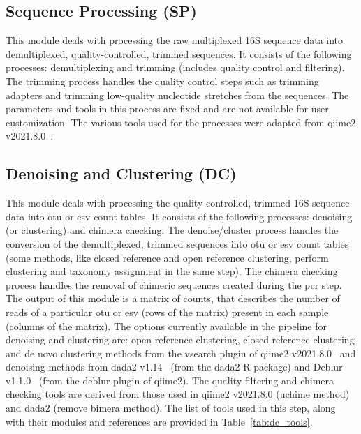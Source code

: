   \subsection*{Sequence Processing (SP)}
  This module deals with processing the raw multiplexed 16S sequence data into demultiplexed, quality-controlled, trimmed sequences.
  It consists of the following processes: demultiplexing and trimming (includes quality control and filtering).
  The trimming process handles the quality control steps such as trimming adapters and trimming low-quality nucleotide stretches from the sequences.
  The parameters and tools in this process are fixed and are not available for user customization.
  The various tools used for the processes were adapted from \ac{qiime2} v2021.8.0~\cite{bolyenReproducibleInteractiveScalable2019}.

  \subsection*{Denoising and Clustering (DC)}
  \vspace{-5mm}
  This module deals with processing the quality-controlled, trimmed 16S sequence data into \ac{otu} or \ac{esv} count tables.
  It consists of the following processes: denoising (or clustering) and chimera checking.
  The denoise/cluster process handles the conversion of the demultiplexed, trimmed sequences into \ac{otu} or \ac{esv} count tables (some methods, like closed reference and open reference clustering, perform clustering and taxonomy assignment in the same step).
  The chimera checking process handles the removal of chimeric sequences created during the \ac{pcr} step.
  The output of this module is a matrix of counts, that describes the number of reads of a particular \ac{otu} or \ac{esv} (rows of the matrix) present in each sample (columns of the matrix).
  The options currently available in the pipeline for denoising and clustering are: open reference clustering, closed reference clustering and de novo clustering methods from the vsearch plugin of \ac{qiime2} v2021.8.0~\cite{bolyenReproducibleInteractiveScalable2019} and denoising methods from \ac{dada2} v1.14~\cite{Callahan2016} (from the \ac{dada2} R package) and Deblur v1.1.0~\cite{Amir2017} (from the deblur plugin of \ac{qiime2}).
  The quality filtering and chimera checking tools are derived from those used in \ac{qiime2} v2021.8.0 (uchime method) and \ac{dada2} (remove bimera method).
  The list of tools used in this step, along with their modules and references are provided in Table~\ref{tab:dc_tools}.

